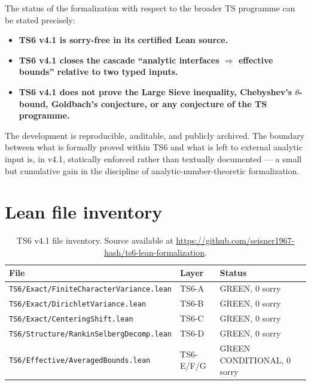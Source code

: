 \documentclass[11pt,a4paper]{article}
\theoremstyle{definition}
\begin{document}
The status of the formalization with respect to the broader TS programme can be stated precisely:

\begin{itemize}[noitemsep]
\item \textbf{TS6 v4.1 is sorry-free in its certified Lean source.}
\item \textbf{TS6 v4.1 closes the cascade ``analytic interfaces $\Rightarrow$ effective bounds'' relative to two typed inputs.}
\item \textbf{TS6 v4.1 does not prove the Large Sieve inequality, Chebyshev's $\theta$-bound, Goldbach's conjecture, or any conjecture of the TS programme.}
\end{itemize}

The development is reproducible, auditable, and publicly archived. The boundary between what is formally proved within TS6 and what is left to external analytic input is, in v4.1, statically enforced rather than textually documented --- a small but cumulative gain in the discipline of analytic-number-theoretic formalization.

\appendix

\section{Lean file inventory}\label{app:files}

\begin{table}[h]
\centering
\small
\renewcommand{\arraystretch}{1.2}
\begin{tabular}{@{}lll@{}}
\toprule
\textbf{File} & \textbf{Layer} & \textbf{Status} \\
\midrule
\verb|TS6/Exact/FiniteCharacterVariance.lean| & TS6-A & GREEN, 0 sorry \\
\verb|TS6/Exact/DirichletVariance.lean| & TS6-B & GREEN, 0 sorry \\
\verb|TS6/Exact/CenteringShift.lean| & TS6-C & GREEN, 0 sorry \\
\verb|TS6/Structure/RankinSelbergDecomp.lean| & TS6-D & GREEN, 0 sorry \\
\verb|TS6/Effective/AveragedBounds.lean| & TS6-E/F/G & GREEN CONDITIONAL, 0 sorry \\
\bottomrule
\end{tabular}
\caption{TS6 v4.1 file inventory. Source available at \url{https://github.com/seisner1967-hash/ts6-lean-formalization}.}\label{tab:files}
\end{table}
\end{document}
